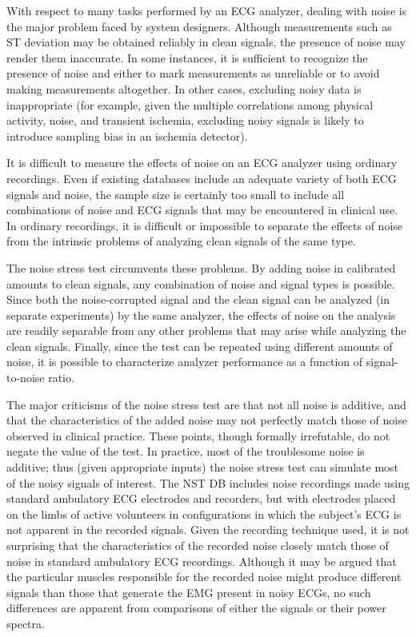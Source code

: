 \documentclass[twoside]{article}
\begin{document}
With respect to many tasks performed by an ECG analyzer, dealing with
noise is the major problem faced by system designers.  Although
measurements such as ST deviation may be obtained reliably in clean
signals, the presence of noise may render them inaccurate.  In some
instances, it is sufficient to recognize the presence of noise and either
to mark measurements as unreliable or to avoid making measurements
altogether.  In other cases, excluding noisy data is inappropriate
(for example, given the multiple correlations among physical
activity, noise, and transient ischemia, excluding noisy signals is
likely to introduce sampling bias in an ischemia detector).

It is difficult to measure the effects of noise on an ECG analyzer
using ordinary recordings.  Even if existing databases include an
adequate variety of both ECG signals and noise, the sample size is
certainly too small to include all combinations of noise and ECG
signals that may be encountered in clinical use.  In ordinary
recordings, it is difficult or impossible to separate the effects of
noise from the intrinsic problems of analyzing clean signals of the
same type.

The noise stress test circumvents these problems.  By adding noise
in calibrated amounts to clean signals, any combination of noise and
signal types is possible.  Since both the noise-corrupted signal and
the clean signal can be analyzed (in separate experiments) by the
same analyzer, the effects of noise on the analysis are readily
separable from any other problems that may arise while analyzing the
clean signals.  Finally, since the test can be repeated using
different amounts of noise, it is possible to characterize analyzer
performance as a function of signal-to-noise ratio.

The major criticisms of the noise stress test are that not all noise
is additive, and that the characteristics of the added noise may not
perfectly match those of noise observed in clinical practice.  These
points, though formally irrefutable, do not negate the value of the
test.  In practice, most of the troublesome noise is additive; thus
(given appropriate inputs) the noise stress test can simulate most of
the noisy signals of interest.  The NST DB includes noise recordings
made using standard ambulatory ECG electrodes and recorders, but with
electrodes placed on the limbs of active volunteers in configurations
in which the subject's ECG is not apparent in the recorded signals.
Given the recording technique used, it is not surprising that the
characteristics of the recorded noise closely match those of noise in
standard ambulatory ECG recordings. Although it may be argued that the
particular muscles responsible for the recorded noise might produce
different signals than those that generate the EMG present in noisy
ECGs, no such differences are apparent from comparisons of either the
signals or their power spectra.
\end{document}
